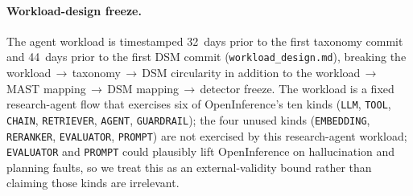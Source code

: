 \documentclass[a4paper,UKenglish,cleveref,autoref,thm-restate]{lipics-v2021}
\begin{document}
\paragraph*{Workload-design freeze.}  The agent workload is timestamped
32~days prior to the first taxonomy commit and 44~days prior to the
first DSM commit (\texttt{workload\_design.md}), breaking the
workload\,$\to$\,taxonomy\,$\to$\,DSM circularity in addition to the
workload\,$\to$\,MAST mapping\,$\to$\,DSM mapping\,$\to$\,detector
freeze.  The workload is a
fixed research-agent flow that exercises six of OpenInference's ten
kinds (\texttt{LLM}, \texttt{TOOL}, \texttt{CHAIN},
\texttt{RETRIEVER}, \texttt{AGENT}, \texttt{GUARDRAIL}); the four
unused kinds (\texttt{EMBEDDING}, \texttt{RERANKER},
\texttt{EVALUATOR}, \texttt{PROMPT}) are not exercised by this
research-agent workload; \texttt{EVALUATOR} and \texttt{PROMPT}
could plausibly lift OpenInference on hallucination and planning
faults, so we treat this as an external-validity bound rather than
claiming those kinds are irrelevant.
\end{document}
